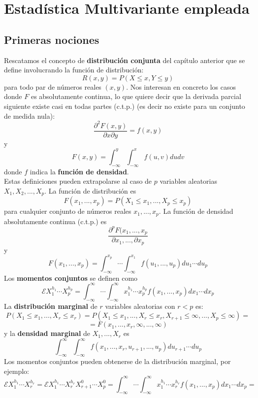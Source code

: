 
\chapter{Estadística Multivariante empleada}\label{Multivariante}
\section{Primeras nociones}
Rescatamos el concepto de \textbf{distribución conjunta} del capítulo anterior que se define involucrando la función de distribución:
\[ R(x,y)=P(X \leq x, Y \leq y) \]
para todo par de números reales $(x,y)$. Nos interesan en concreto los casos donde $F$ es absolutamente continua, lo que quiere decir que la derivada parcial siguiente existe casi en todas partes (c.t.p.) (es decir no existe para un conjunto de medida nula):
\[ \frac{\partial^{2} F(x,y)}{\partial x \partial y}=f(x,y) \]
y 
\[ F(x,y) = \int_{-\infty}^{y} \int_{-\infty}^{x} f(u,v) du dv   \]
donde $f$ indica la \textbf{función de densidad}.\\
Estas definiciones pueden extrapolarse al caso de $p$ variables aleatorias $X_{1},X_{2},...,X_{p}$. La función de distribución es
\[ F(x_{1},...,x_{p})=P(X_{1} \leq x_{1},...,X_{p} \leq x_{p}) \]
para cualquier conjunto de números reales $x_{1},...,x_{p}$. La función de densidad absolutamente continua (c.t.p.) es
\[ \frac{\partial^{p} F(x_{1},...,x_{p}}{\partial x_{1},...,\partial x_{p}} \]
y 
\[ F(x_{1},...,x_{p})= \int_{-\infty}^{x_{p}} \dotsb \int_{-\infty}^{x_{1}} f(u_{1},...,u_{p})du_{1} \dotsb du_{p} \]
Los \textbf{momentos conjuntos} se definen como
\[ \mathcal{E} X_{1}^{h_{1}} \dotsb X_{p}^{h_{p}} = \int_{-\infty}^{\infty} \dotsb \int_{-\infty}^{\infty} x_{1}^{h_{1}} \dotsb x_{p}^{h_{p}} f(x_{1},...,x_{p})dx_{1} \dotsb dx_{p} \]
La \textbf{distribución marginal} de $r$ variables aleatorias con $r<p$ es:
\[ P(X_{1} \leq x_{1},...,X_{r} \leq x_{r})= P(X_{1} \leq x_{1},...,X_{r} \leq x_{r}, X_{r+1} \leq \infty,...,X_{p} \leq \infty)= \]
\[ =F(x_{1},...,x_{r},\infty,...,\infty) \]
y la \textbf{densidad marginal} de $X_{1},...,X_{r}$ es
\[ \int_{-\infty}^{\infty} \int_{-\infty}^{\infty} f(x_{1},...,x_{r},u_{r+1},...,u_{p})du_{r+1} \dotsb du_{p} \]
Los momentos conjuntos pueden obtenerse de la distribución marginal, por ejemplo:
\[ \mathcal{E} X_{1}^{h_{1}} \dotsb X_{r}^{h_{r}} = \mathcal{E} X_{1}^{h_{1}} \dotsb X_{r}^{h_{r}} X_{r+1}^{0} \dotsb X_{p}^{0} = \int_{-\infty}^{\infty} \dotsb \int_{-\infty}^{\infty} x_{1}^{h_{1}} \dotsb x_{r}^{h_{r}} f(x_{1},...,x_{p})dx_{1} \dotsb dx_{p}= \]

